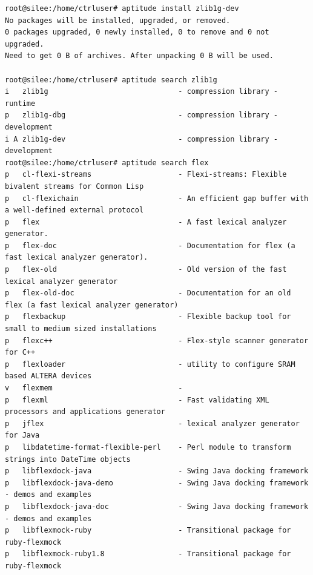 \documentclass[11pt
  , a4paper
  , article
  , oneside
]{memoir}
\begin{document}
\begin{lstlisting}[style=termstyle]
root@silee:/home/ctrluser# aptitude install zlib1g-dev
No packages will be installed, upgraded, or removed.
0 packages upgraded, 0 newly installed, 0 to remove and 0 not upgraded.
Need to get 0 B of archives. After unpacking 0 B will be used.

root@silee:/home/ctrluser# aptitude search zlib1g
i   zlib1g                              - compression library - runtime                                      
p   zlib1g-dbg                          - compression library - development                                  
i A zlib1g-dev                          - compression library - development                                  
root@silee:/home/ctrluser# aptitude search flex
p   cl-flexi-streams                    - Flexi-streams: Flexible bivalent streams for Common Lisp           
p   cl-flexichain                       - An efficient gap buffer with a well-defined external protocol      
p   flex                                - A fast lexical analyzer generator.                                 
p   flex-doc                            - Documentation for flex (a fast lexical analyzer generator).        
p   flex-old                            - Old version of the fast lexical analyzer generator                 
p   flex-old-doc                        - Documentation for an old flex (a fast lexical analyzer generator)  
p   flexbackup                          - Flexible backup tool for small to medium sized installations       
p   flexc++                             - Flex-style scanner generator for C++                               
p   flexloader                          - utility to configure SRAM based ALTERA devices                     
v   flexmem                             -                                                                    
p   flexml                              - Fast validating XML processors and applications generator          
p   jflex                               - lexical analyzer generator for Java                                
p   libdatetime-format-flexible-perl    - Perl module to transform strings into DateTime objects             
p   libflexdock-java                    - Swing Java docking framework                                       
p   libflexdock-java-demo               - Swing Java docking framework - demos and examples                  
p   libflexdock-java-doc                - Swing Java docking framework - demos and examples                  
p   libflexmock-ruby                    - Transitional package for ruby-flexmock                             
p   libflexmock-ruby1.8                 - Transitional package for ruby-flexmock                             

\end{lstlisting}
\end{document}
